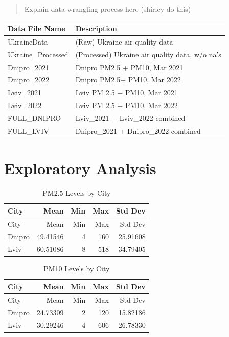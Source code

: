 \documentclass[
  12pt,
]{article}
\begin{document}
\begin{quote}
Explain data wrangling process here (shirley do this)
\end{quote}

\begin{longtable}[]{@{}ll@{}}
\toprule
Data File Name & Description \\
\midrule
\endhead
UkraineData & (Raw) Ukraine air quality data \\
Ukraine\_Processed & (Processed) Ukraine air quality data, w/o na's \\
Dnipro\_2021 & Dnipro PM2.5 + PM10, Mar 2021 \\
Dnipro\_2022 & Dnipro PM2.5+ PM10, Mar 2022 \\
Lviv\_2021 & Lviv PM 2.5 + PM10, Mar 2021 \\
Lviv\_2022 & Lviv PM 2.5 + PM10, Mar 2022 \\
FULL\_DNIPRO & Lviv\_2021 + Lviv\_2022 combined \\
FULL\_LVIV & Dnipro\_2021 + Dnipro\_2022 combined \\
\bottomrule
\end{longtable}

\newpage

\hypertarget{exploratory-analysis}{%
\section{Exploratory Analysis}\label{exploratory-analysis}}

\begin{longtable}[]{@{}lrrrr@{}}
\caption{PM2.5 Levels by City}\tabularnewline
\toprule
City & Mean & Min & Max & Std Dev \\
\midrule
\endfirsthead
\toprule
City & Mean & Min & Max & Std Dev \\
\midrule
\endhead
Dnipro & 49.41546 & 4 & 160 & 25.91608 \\
Lviv & 60.51086 & 8 & 518 & 34.79405 \\
\bottomrule
\end{longtable}

\begin{longtable}[]{@{}lrrrr@{}}
\caption{PM10 Levels by City}\tabularnewline
\toprule
City & Mean & Min & Max & Std Dev \\
\midrule
\endfirsthead
\toprule
City & Mean & Min & Max & Std Dev \\
\midrule
\endhead
Dnipro & 24.73309 & 2 & 120 & 15.82186 \\
Lviv & 30.29246 & 4 & 606 & 26.78330 \\
\bottomrule
\end{longtable}
\end{document}
